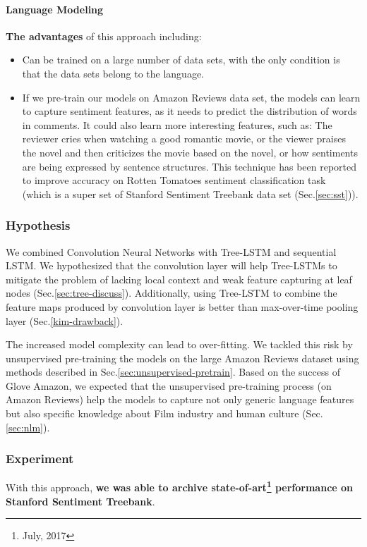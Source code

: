 \paragraph{Language Modeling}
\textbf{The advantages} of this approach including:
\begin{itemize}
\item Can be trained on a large number of data sets, with the only condition is that the data sets belong to the language.
\item If we pre-train our models on Amazon Reviews data set, the models can learn to capture sentiment features, as it needs to predict the distribution of words in comments.
It could also learn more interesting features, such as: 
The reviewer cries when watching a good romantic movie, or the viewer praises the novel and then criticizes the movie based on the novel, or how sentiments are being expressed by sentence structures. 
This technique has been reported to improve accuracy on Rotten Tomatoes sentiment classification task~\cite{Rotten-Tomato} (which is a super set of Stanford Sentiment Treebank data set (Sec.\ref{sec:sst})).
\end{itemize}


\subsubsection{Hypothesis}
We combined Convolution Neural Networks with Tree-LSTM and sequential LSTM.
We hypothesized that the convolution layer will help Tree-LSTMs to mitigate the problem of lacking local context and weak feature capturing at leaf nodes (Sec.\ref{sec:tree-discuss}).
Additionally, using Tree-LSTM to combine the feature maps produced by convolution layer is better than max-over-time pooling layer (Sec.\ref{kim-drawback}).

The increased model complexity can lead to over-fitting.
We tackled this risk by unsupervised pre-training the models on the large Amazon Reviews dataset using methods described in Sec.\ref{sec:unsupervised-pretrain}.
Based on the success of Glove Amazon, we expected that the unsupervised pre-training process (on Amazon Reviews) help the models to capture not only generic language features but also specific knowledge about Film industry and human culture (Sec.\ref{sec:nlm}).

\subsubsection{Experiment}
With this approach, \textbf{we was able to archive state-of-art\footnote{July, 2017} performance on Stanford Sentiment Treebank}.


